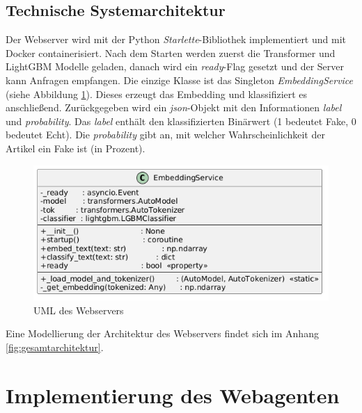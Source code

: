 \subsection{Technische Systemarchitektur}

Der Webserver wird mit der Python \textit{Starlette}-Bibliothek implementiert und mit Docker containerisiert.
Nach dem Starten werden zuerst die Transformer und LightGBM Modelle geladen, danach wird ein \textit{ready}-Flag gesetzt und der Server kann Anfragen empfangen.
Die einzige Klasse ist das Singleton \textit{EmbeddingService} (siehe Abbildung \ref{fig:uml_webserver}). Dieses erzeugt das Embedding und klassifiziert es anschließend.
Zurückgegeben wird ein \textit{json}-Objekt mit den Informationen \textit{label} und \textit{probability}. Das \textit{label} enthält den klassifizierten Binärwert 
(1 bedeutet Fake, 0 bedeutet Echt). Die \textit{probability} gibt an, mit welcher Wahrscheinlichkeit der Artikel ein Fake ist (in Prozent).

\begin{figure}[htbp]
    \begin{center}
        \includegraphics[scale=0.55]{static/uml_webserver.png}
        \caption{\label{fig:uml_webserver} UML des Webservers}
    \end{center}
\end{figure}

Eine Modellierung der Architektur des Webservers findet sich im Anhang \ref{fig:gesamtarchitektur}.

\section{Implementierung des Webagenten}

